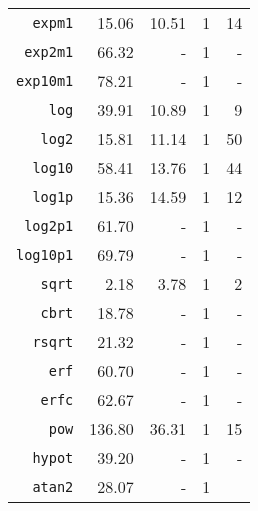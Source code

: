 \begin{table}
\begin{tabular}{r|rr|rr}
\texttt{expm1} & 15.06 & 10.51 & 1 & 14 \\
\texttt{exp2m1} & 66.32 & - & 1 & - \\
\texttt{exp10m1} & 78.21 & - & 1 & - \\
\texttt{log} & 39.91 & 10.89 & 1 & 9 \\
\texttt{log2} & 15.81 & 11.14 & 1 & 50 \\
\texttt{log10} & 58.41 & 13.76 & 1 & 44 \\
\texttt{log1p} & 15.36 & 14.59 & 1 & 12 \\
\texttt{log2p1} & 61.70 & - & 1 & - \\
\texttt{log10p1} & 69.79 & - & 1 & - \\
\texttt{sqrt} & 2.18 & 3.78 & 1 & 2 \\
\texttt{cbrt} & 18.78 & - & 1 & - \\
\texttt{rsqrt} & 21.32 & - & 1 & - \\
\texttt{erf} & 60.70 & - & 1 & - \\
\texttt{erfc} & 62.67 & - & 1 & - \\
\texttt{pow} & 136.80 & 36.31 & 1 & 15 \\
\texttt{hypot} & 39.20 & - & 1 & - \\
\texttt{atan2} & 28.07 & - & 1 & \\
\end{tabular}
\end{table}
